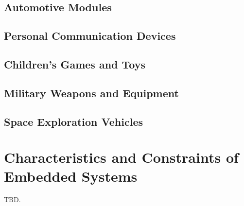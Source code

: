 \subsection{Automotive Modules}
\label{cint0:sexa0:samd0}


\subsection{Personal Communication Devices}
\label{cint0:sexa0:spcd0}


\subsection{Children's Games and Toys}
\label{cint0:sexa0:scty0}


\subsection{Military Weapons and Equipment}
\label{cint0:sexa0:scty1}


\subsection{Space Exploration Vehicles}
\label{cint0:sexa0:scty2}


\section{Characteristics and Constraints of Embedded Systems}
\label{cint0:sccn0}

TBD.


